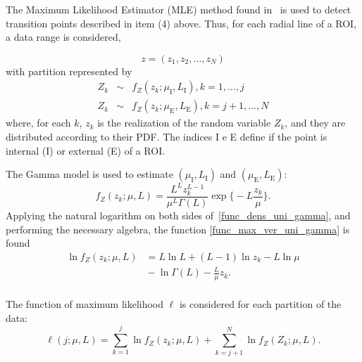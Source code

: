 \documentclass[journal]{IEEEtran}
\begin{document}
The Maximum Likelihood Estimator (MLE) method found in~\cite{gmbf, nhfc} is used to detect transition points described in item (4) above. Thus, for each radial line of a ROI, a data range is considered,

\begin{equation}\nonumber
	z = (z_1,z_2,\dots,z_N)
\end{equation}
with partition represented by
\begin{equation}\label{func_max_ver_uni_gamma} 
\begin{array}{lll}
	Z_k&\sim& f_Z(z_k;\mu_\text{I},L_\text{I}), k=1,\dots,j\\
	Z_k&\sim& f_Z(z_k;\mu_\text{E},L_\text{E}), k=j+1,\dots,N
\end{array}
\end{equation}
where, for each $k$, $z_k$ is the realization of the random variable $Z_k$, and they are distributed according to their PDF. The indices I e E define if the point is internal (I) or external (E) of a ROI.

The Gamma model is used to estimate $(\mu_\text{I},L_\text{I})$ and $(\mu_\text{E},L_\text{E})$:
\begin{equation}\label{func_dens_uni_gamma}
	f_Z(z_k;\mu,L)=\frac{L^{L}z_k^{L-1}}{\mu^{L}\Gamma(L)} \exp\Big\{-L\frac{z_k}{\mu}\Big\}.
\end{equation}
Applying the natural logarithm on both sides of~\eqref{func_dens_uni_gamma}, and performing  the necessary algebra,  the function \eqref{func_max_ver_uni_gamma} is found
\begin{equation}\label{func_max_ver_uni_gamma}
\begin{split}
	\ln f_Z(z_k;\mu,L)&= L\ln L +(L - 1) \ln z_k-L \ln \mu \\
	 	                  &{}- \ln \Gamma(L) -\frac{L}{\mu} z_k.\\
\end{split}
\end{equation}

The function of maximum likelihood $\ell$ is considered for each partition of the data:
\begin{equation}\nonumber
\ell(j;\mu, L)=\sum_{k=1}^{j}\ln f_{Z}(z_k;\mu,L)
             +\sum_{k=j+1}^{N}\ln f_{Z}(Z_k;\mu,L).
\end{equation}
 
\end{document}
